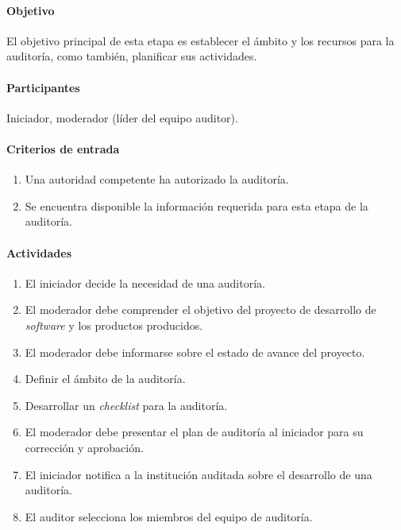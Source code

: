 \paragraph{Objetivo\\}

El objetivo principal de esta etapa es establecer el ámbito y los recursos para la auditoría, como también, planificar sus actividades.

\paragraph{Participantes\\}

Iniciador, moderador (líder del equipo auditor).

\paragraph{Criterios de entrada}

\begin{enumerate}
	\item
		Una autoridad competente ha autorizado la auditoría.
	\item
		Se encuentra disponible la información requerida para esta etapa de la auditoría.
\end{enumerate}

\paragraph{Actividades}

\begin{enumerate}
	\item
		El iniciador decide la necesidad de una auditoría.
	\item
		El moderador debe comprender el objetivo del proyecto de desarrollo de \textit{software} y los productos producidos.
	\item	
		El moderador debe informarse sobre el estado de avance del proyecto.
	\item
		Definir el ámbito de la auditoría.
	\item
		Desarrollar un \textit{checklist} para la auditoría.
	\item
		El moderador debe presentar el plan de auditoría al iniciador para su corrección y aprobación. 
	\item
		El iniciador notifica a la institución auditada sobre el desarrollo de una auditoría.
	\item
		El auditor selecciona los miembros del equipo de auditoría.
\end{enumerate}

